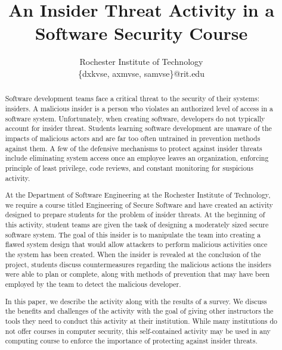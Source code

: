\documentclass[conference]{IEEEtran}
\begin{document}
\title{An Insider Threat Activity in a Software Security Course}

\author{
Rochester Institute of Technology\\
\{dxkvse, axmvse, samvse\}@rit.edu

}


\maketitle
\begin{abstract}



Software development teams face a critical threat to the security of their systems: insiders. A malicious insider is a person who violates an authorized level of access in a software system. Unfortunately, when creating software, developers do not typically account for insider threat. Students learning software development are unaware of the impacts of malicious actors and are far too often untrained in prevention methods against them. A few of the defensive mechanisms to protect against insider threats include eliminating system access once an employee leaves an organization, enforcing principle of least privilege, code reviews, and constant monitoring for suspicious activity.

At the Department of Software Engineering at the Rochester Institute of Technology, we require a course titled Engineering of Secure Software and have created an activity designed to prepare students for the problem of insider threats. At the beginning of this activity, student teams are given the task of designing a moderately sized secure software system. The goal of this insider is to manipulate the team into creating a flawed system design that would allow attackers to perform malicious activities once the system has been created. When the insider is revealed at the conclusion of the project, students discuss countermeasures regarding the malicious actions the insiders were able to plan or complete, along with methods of prevention that may have been employed by the team to detect the malicious developer.

In this paper, we describe the activity along with the results of a survey. We discuss the benefits and challenges of the activity with the goal of giving other instructors the tools they need to conduct this activity at their institution. While many institutions do not offer courses in computer security, this self-contained activity may be used in any computing course to enforce the importance of protecting against insider threats.


\end{abstract}
\end{document}
